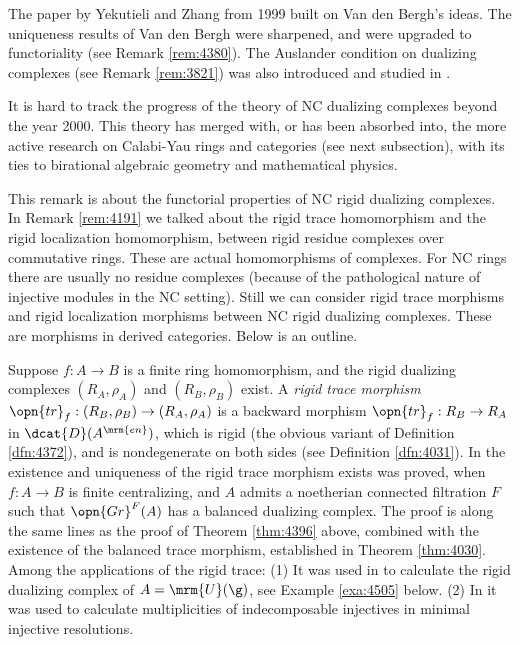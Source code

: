 \begin{rem}
The paper \cite{YeZh1} by Yekutieli and Zhang from 1999 built on Van den 
Bergh's ideas. The uniqueness results of Van den Bergh were sharpened, and were 
upgraded to functoriality (see Remark \ref{rem:4380}). The Auslander condition 
on dualizing complexes (see Remark \ref{rem:3821}) was also introduced and 
studied in \cite{YeZh1}.

It is hard to track the progress of the theory of NC dualizing complexes beyond 
the year 2000. This theory has merged with, or has been absorbed 
into, the more active research on Calabi-Yau rings and categories
(see next subsection), with its ties 
to birational algebraic geometry and mathematical physics. 
\end{rem}

\begin{rem} \label{rem:4380}
This remark is about the functorial properties of NC rigid dualizing 
complexes. In Remark \ref{rem:4191} we talked about the rigid trace 
homomorphism and the rigid localization homomorphism, between rigid residue 
complexes over commutative rings. These are actual homomorphisms of complexes. 
For NC rings there are usually no residue complexes (because of the pathological 
nature of injective modules in the NC setting). 
Still we can consider rigid trace morphisms and rigid localization morphisms 
between NC rigid dualizing complexes. These are morphisms in 
derived categories. Below is an outline. 

Suppose $f : A \to B$ is a finite ring homomorphism, and the rigid dualizing 
complexes $(R_A, \rho_A)$ and $(R_B, \rho_B)$ exist. A {\em rigid trace 
morphism} 
$\opn{tr}_f : (R_B, \rho_B) \to (R_A, \rho_A)$ 
is a backward morphism $\opn{tr}_f : R_B \to R_A$ in $\dcat{D}(A^{\mrm{en}})$, 
which is rigid (the obvious 
variant of Definition \ref{dfn:4372}), and is nondegenerate on both sides 
(see Definition \ref{dfn:4031}). In \cite{YeZh1} the existence and uniqueness 
of the rigid trace morphism exists was proved, when $f : A \to 
B$ is finite centralizing, and $A$ admits a noetherian connected filtration $F$ 
such that $\opn{Gr}^F(A)$ has a balanced dualizing complex. The proof is along 
the same lines as the proof of Theorem \ref{thm:4396} above, combined 
with the existence of the balanced trace morphism, established in Theorem 
\ref{thm:4030}. Among the applications of the rigid trace: (1) It was used 
in \cite{Ye4.5} to calculate the rigid dualizing complex of 
$A = \mrm{U}(\g)$, see Example \ref{exa:4505} below. (2) In 
\cite{YeZh1.5} it was used to calculate multiplicities of indecomposable 
injectives in minimal injective resolutions. 


\end{rem}
